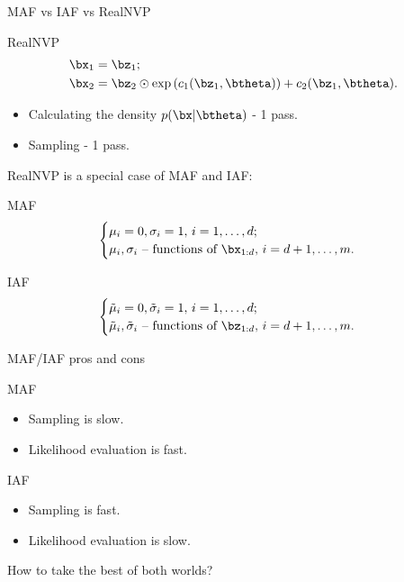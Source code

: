 \begin{frame}{MAF vs IAF vs RealNVP}
	\begin{block}{RealNVP}
		\vspace{-0.8cm}
		\begin{align*}
			\bx_1 &= \bz_1; \\ 
			\bx_2 &= \bz_2 \odot \exp \left(c_1(\bz_1, \btheta)\right) + c_2(\bz_1, \btheta).
		\end{align*}
		\vspace{-0.8cm}
	\end{block}
	\begin{itemize}
		\item Calculating the density $p(\bx | \btheta)$ - 1 pass.
		\item Sampling - 1 pass.
	\end{itemize}
	
	RealNVP is a special case of MAF and IAF:
	\begin{block}{MAF}
		\vspace{-0.5cm}
		\begin{equation*}
			\begin{cases}
				\mu_i  = 0, \sigma_i = 1, \, i = 1, \dots, d; \\
				\mu_i, \sigma_i \text{ -- functions of } \bx_{1:d}, \, i = d+1, \dots, m.
			\end{cases}
		\end{equation*}
		\vspace{-0.3cm}
	\end{block}
	\begin{block}{IAF}
		\vspace{-0.3cm}
		\begin{equation*}
			\begin{cases}
				\tilde{\mu}_i = 0, \tilde{\sigma}_i = 1, \, i = 1, \dots, d; \\
				\tilde{\mu}_i, \tilde{\sigma}_i \text{ -- functions of } \bz_{1:d}, \, i = d+1, \dots, m.
			\end{cases}
		\end{equation*}
	\end{block}
\end{frame}
\begin{frame}{MAF/IAF pros and cons}
	\begin{block}{MAF}
		\begin{itemize}
			\item Sampling is slow.
			\item Likelihood evaluation is fast.
		\end{itemize}
	\end{block}
	\begin{block}{IAF}
		\begin{itemize}
			\item Sampling is fast.
			\item Likelihood evaluation is slow.
		\end{itemize}
	\end{block}
	\vspace{0.3cm}
	How to take the best of both worlds?
\end{frame}
